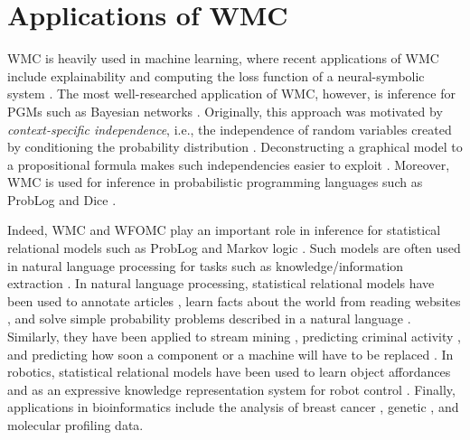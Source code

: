 \section{Applications of WMC}\label{sec:applications}


WMC is heavily used in machine learning, where recent applications of WMC
include explainability \citep{DBLP:conf/aaai/BroeckLSS21} and computing the loss
function of a neural-symbolic system
\citep{DBLP:conf/aaai/TsamouraHM21,DBLP:conf/icml/XuZFLB18}. The most
well-researched application of WMC, however, is inference for PGMs such as
Bayesian networks
\citep{DBLP:conf/ecai/BartKLM16,DBLP:conf/ijcai/ChaviraD05,DBLP:conf/sat/ChaviraD06,DBLP:conf/kr/Darwiche02,DBLP:conf/aaai/SangBK05}.
Originally, this approach was motivated by \emph{context-specific independence},
i.e., the independence of random variables created by conditioning the
probability distribution \citep{DBLP:conf/uai/BoutilierFGK96}. Deconstructing a
graphical model to a propositional formula makes such independencies easier to
exploit \citep{DBLP:conf/kr/Darwiche02}. Moreover, WMC is used for inference in
probabilistic programming languages such as ProbLog
\citep{DBLP:journals/tplp/FierensBRSGTJR15,DBLP:conf/aaai/VlasselaerKDMR16} and
Dice \citep{DBLP:journals/pacmpl/HoltzenBM20}.

Indeed, WMC and WFOMC play an important role in inference for statistical
relational models such as ProbLog and Markov logic
\citep{DBLP:series/synthesis/2016Raedt,DBLP:conf/nips/Broeck11}. Such models are
often used in natural language processing for tasks such as
knowledge/information extraction
\citep{bunescu2007statistical,DBLP:conf/naacl/PoonV10}. In natural language
processing, statistical relational models have been used to annotate articles
\citep{DBLP:conf/emnlp/VerbekeAMFDR12}, learn facts about the world from reading
websites \citep{DBLP:conf/aaai/CarlsonBKSHM10}, and solve simple probability
problems described in a natural language \citep{DBLP:conf/ijcai/DriesKDBR17}.
Similarly, they have been applied to stream mining
\citep{DBLP:conf/icdm/ChandraSKTA14}, predicting criminal activity
\citep{DBLP:conf/sdm/DelaneyFCWJ10}, and predicting how soon a component or a
machine will have to be replaced \citep{vlasselaer2012statistical}. In robotics,
statistical relational models have been used to learn object affordances
\citep{DBLP:conf/ilp/MoldovanORMS11,DBLP:conf/icra/MoldovanMOSR12,DBLP:conf/iros/MoldovanR14}
and as an expressive knowledge representation system for robot control
\citep{DBLP:conf/icra/JainMB09}. Finally, applications in bioinformatics include
the analysis of breast cancer
\citep{DBLP:conf/ilp/Corte-RealD017,DBLP:conf/pkdd/NassifKBPSC13}, genetic
\citep{DBLP:journals/jcb/SakhanenkoG12}, and molecular profiling
\citep{de2013phenetic} data.

